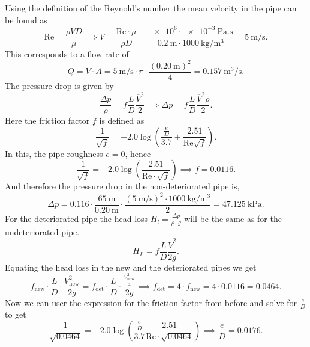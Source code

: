 \begin{derivation}
  Using the definition of the Reynold's number the mean velocity in the pipe can be found as
  \[ 
    \mathrm{Re} = \frac{\rho V D}{\mu} \implies V = \frac{\mathrm{Re} \cdot \mu}{\rho D} = \frac{\num{e6} \cdot \qty{e-3}{\Pa.\s}}{\qty{0,2}{\m} \cdot \qty{1000}{\kg\per\cubic\m}  } = \qty{5}{\m\per\s} 
  .\]
  This corresponds to a flow rate of
  \[ 
  Q = V \cdot A = \qty{5}{\m\per\s} \cdot \pi \cdot \frac{\left( \qty{0,20}{\m}  \right)^2}{4} = \qty{0,157}{\cubic\m\per\s} 
  .\]
  The pressure drop is given by
  \[ 
    \frac{\Delta p}{\rho} = f \frac{L}{D} \frac{\overline{V}^2}{2} \implies \Delta p = f \frac{L}{D} \frac{\overline{V}^2 \rho}{2}
  .\]
  Here the friction factor $f$ is defined as
  \[ 
  \frac{1}{\sqrt{f}} = - \num{2,0} \log \left( \frac{\frac{e}{D}}{\num{3,7} } + \frac{\num{2,51} }{\mathrm{Re} \sqrt{f}} \right)
  .\]
  In this, the pipe roughness $e = 0$, hence
  \[ 
  \frac{1}{\sqrt{f}} = \num{-2,0}  \log \left( \frac{\num{2,51} }{\mathrm{Re} \cdot \sqrt{f}} \right) \implies f = \num{0,0116}
  .\]
  And therefore the pressure drop in the non-deteriorated pipe is,
  \[ 
  \Delta p = \num{0,116} \cdot \frac{\qty{65}{\m} }{\qty{0,20}{\m} } \cdot \frac{\left( \qty{5}{\m\per\s}  \right)^2 \cdot \qty{1000}{\kg\per\cubic\m} }{2} = \qty{47,125}{\kPa}
  .\]
  For the deteriorated pipe the head loss $H_l = \frac{\Delta p}{\rho \cdot g}$ will be the same as for the undeteriorated pipe.
  \[ 
    H_L = f \frac{L}{D} \frac{\overline{V}^2}{2g}
  .\]
  Equating the head loss in the new and the deteriorated pipes we get
  \[ 
  f_{\mathrm{new}} \cdot \frac{L}{D} \cdot \frac{V^2_{\mathrm{new}}}{2g} = f_{\mathrm{det}} \cdot \frac{L}{D} \cdot \frac{\frac{V^2_{\mathrm{new}}}{4}}{2g} \implies f_{\mathrm{det}} = 4 \cdot f_{\mathrm{new}} = 4 \cdot \num{0,0116} = \num{0,0464} 
  .\]
  Now we can user the expression for the friction factor from before and solve for $\frac{e}{D}$ to get
  \[ 
    \frac{1}{\sqrt{\num{0,0464} }} = \num{-2,0}  \log \left( \frac{\frac{e}{D}}{\num{3,7} } \frac{\num{2,51} }{\mathrm{Re} \cdot \sqrt{\num{0,0464} }} \right) \implies \frac{e}{D} = \num{0,0176} 
  .\]
\end{derivation}

